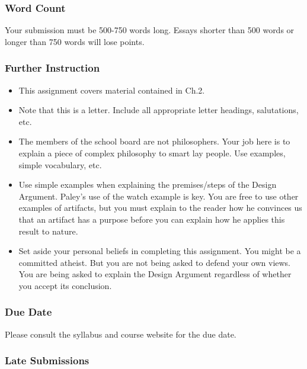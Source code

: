 \documentclass[]{article}
\begin{document}
\subsubsection{Word Count}\label{word-count}

Your submission must be 500-750 words long. Essays shorter than 500
words or longer than 750 words will lose points.

\subsubsection{Further Instruction}\label{further-instruction}

\begin{itemize}
\itemsep1pt\parskip0pt
\item
  This assignment covers material contained in Ch.2.
\item
  Note that this is a letter. Include all appropriate letter headings,
  salutations, etc.
\item
  The members of the school board are not philosophers. Your job here is
  to explain a piece of complex philosophy to smart lay people. Use
  examples, simple vocabulary, etc.
\item
  Use simple examples when explaining the premises/steps of the Design
  Argument. Paley's use of the watch example is key. You are free to use
  other examples of artifacts, but you must explain to the reader how he
  convinces us that an artifact has a purpose before you can explain how
  he applies this result to nature.\\
\item
  Set aside your personal beliefs in completing this assignment. You
  might be a committed atheist. But you are not being asked to defend
  your own views. You are being asked to explain the Design Argument
  regardless of whether you accept its conclusion.
\end{itemize}

\subsubsection{Due Date}\label{due-date}

Please consult the syllabus and course website for the due date.

\subsubsection{Late Submissions}\label{late-submissions}
\end{document}
